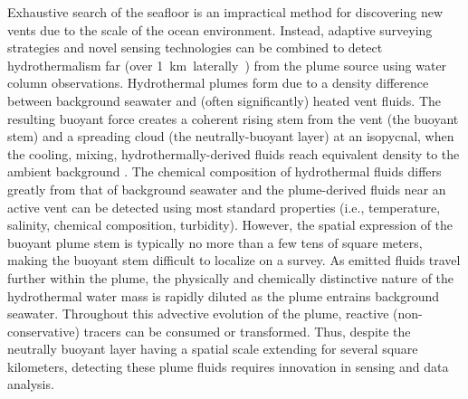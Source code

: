 Exhaustive search of the seafloor is an impractical method for discovering new vents due to the scale of the ocean environment. Instead, adaptive surveying strategies and novel sensing technologies can be combined to detect hydrothermalism far (over \SI{1}{\kilo\meter laterally)} from the plume source using water column observations. Hydrothermal plumes form due to a density difference between background seawater and (often significantly) heated vent fluids. The resulting buoyant force creates a coherent rising stem from the vent (the buoyant stem) and a spreading cloud (the neutrally-buoyant layer) at an isopycnal, when the cooling, mixing, hydrothermally-derived fluids reach equivalent density to the ambient background \cite{morton1956turbulent, speer1989model}. The chemical composition of hydrothermal fluids differs greatly from that of background seawater and the plume-derived fluids near an active vent can be detected using most standard properties (i.e., temperature, salinity, chemical composition, turbidity). However, the spatial expression of the buoyant plume stem is typically no more than a few tens of square meters, making the buoyant stem difficult to localize on a survey. As emitted fluids travel further within the plume, the physically and chemically distinctive nature of the hydrothermal water mass is rapidly diluted as the plume entrains background seawater. Throughout this advective evolution of the plume, reactive (non-conservative) tracers can be consumed or transformed. Thus, despite the neutrally buoyant layer having a spatial scale extending for several square kilometers, detecting these plume fluids requires innovation in sensing and data analysis.

